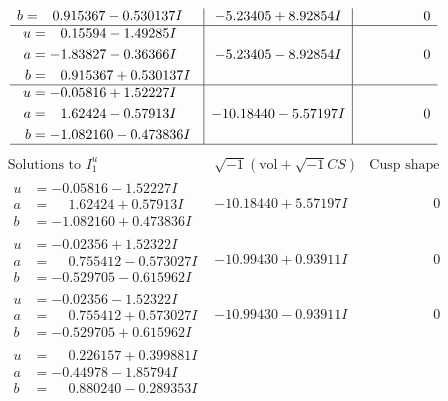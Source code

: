 \documentclass[1p]{elsarticle_modified}
\theoremstyle{definition}
\newcommand{\I}{\sqrt{-1}}
\begin{document}
$$\begin{array}{c|c|c}
\begin{aligned}
b &= \phantom{-}0.915367 - 0.530137 I\end{aligned}
 & -5.23405 + 8.92854 I & \phantom{-0.000000 } 0 \\ \hline\begin{aligned}
u &= \phantom{-}0.15594 - 1.49285 I \\
a &= -1.83827 - 0.36366 I \\
b &= \phantom{-}0.915367 + 0.530137 I\end{aligned}
 & -5.23405 - 8.92854 I & \phantom{-0.000000 } 0 \\ \hline\begin{aligned}
u &= -0.05816 + 1.52227 I \\
a &= \phantom{-}1.62424 - 0.57913 I \\
b &= -1.082160 - 0.473836 I\end{aligned}
 & -10.18440 - 5.57197 I & \phantom{-0.000000 } 0\\
 \hline 
 \end{array}$$\newpage$$\begin{array}{c|c|c}  
\text{Solutions to }I^u_{1}& \I (\text{vol} + \sqrt{-1}CS) & \text{Cusp shape}\\
 \hline 
\begin{aligned}
u &= -0.05816 - 1.52227 I \\
a &= \phantom{-}1.62424 + 0.57913 I \\
b &= -1.082160 + 0.473836 I\end{aligned}
 & -10.18440 + 5.57197 I & \phantom{-0.000000 } 0 \\ \hline\begin{aligned}
u &= -0.02356 + 1.52322 I \\
a &= \phantom{-}0.755412 - 0.573027 I \\
b &= -0.529705 - 0.615962 I\end{aligned}
 & -10.99430 + 0.93911 I & \phantom{-0.000000 } 0 \\ \hline\begin{aligned}
u &= -0.02356 - 1.52322 I \\
a &= \phantom{-}0.755412 + 0.573027 I \\
b &= -0.529705 + 0.615962 I\end{aligned}
 & -10.99430 - 0.93911 I & \phantom{-0.000000 } 0 \\ \hline\begin{aligned}
u &= \phantom{-}0.226157 + 0.399881 I \\
a &= -0.44978 - 1.85794 I \\
b &= \phantom{-}0.880240 - 0.289353 I\end{aligned}

\end{array}$$
\end{document}
